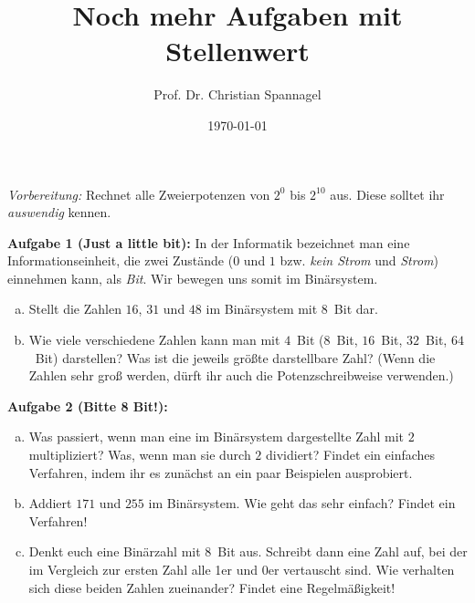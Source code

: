 \documentclass{../cssheet}
\title{Noch mehr Aufgaben mit Stellenwert}
\author{Prof. Dr. Christian Spannagel}
\date{\today}
\begin{document}
\printtitle

\emph{Vorbereitung:} Rechnet alle Zweierpotenzen von  $2^0$ bis $2^{10}$ aus. Diese solltet ihr \emph{auswendig} kennen.

\textbf{Aufgabe 1 (Just a little bit):}  In der Informatik bezeichnet man eine Informationseinheit, die zwei Zustände ($0$ und $1$ bzw. \emph{kein Strom} und \emph{Strom}) einnehmen kann, als \emph{Bit}. Wir bewegen uns somit im Binärsystem. 
\begin{enumerate}[a)]
\item Stellt die Zahlen $16$, $31$ und $48$ im Binärsystem mit 8~Bit dar. 
\item Wie viele verschiedene Zahlen kann man mit $4$~Bit ($8$~Bit, $16$~Bit, $32$~Bit, $64$~Bit) darstellen? Was ist die jeweils größte darstellbare Zahl?  (Wenn die Zahlen sehr groß werden, dürft ihr auch die Potenzschreibweise verwenden.)
\end{enumerate}

\textbf{Aufgabe 2 (Bitte 8 Bit!):} 
\begin{enumerate}[a)]
\item Was passiert, wenn man eine im Binärsystem dargestellte Zahl mit $2$ multipliziert? Was, wenn man sie durch $2$ dividiert? Findet ein einfaches Verfahren, indem ihr es zunächst an ein paar Beispielen ausprobiert.
\item Addiert $171$ und $255$ im Binärsystem. Wie geht das sehr einfach? Findet ein Verfahren!
\item Denkt euch eine Binärzahl mit 8~Bit aus. Schreibt dann eine Zahl auf, bei der im Vergleich zur ersten Zahl alle 1er und 0er vertauscht sind. Wie verhalten sich diese beiden Zahlen zueinander? Findet eine Regelmäßigkeit!
\end{enumerate}


\vspace*{10mm}
\printlicense

\printsocials
\end{document}
